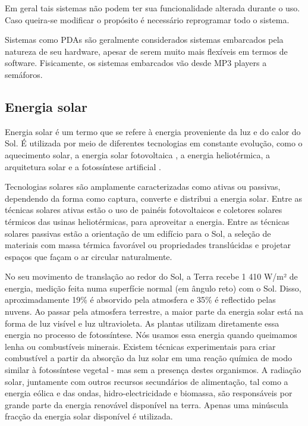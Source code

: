 \documentclass[final,12pt, times, 5p, twocolumn]{elsarticle}
\begin{document}
Em geral tais sistemas não podem ter sua funcionalidade alterada durante o uso. Caso queira-se modificar o propósito é necessário reprogramar todo o sistema.

Sistemas como PDAs são geralmente considerados sistemas embarcados pela natureza de seu hardware, apesar de serem muito mais flexíveis em termos de software. Fisicamente, os sistemas embarcados vão desde MP3 players a semáforos.

\subsection{Energia solar}

Energia solar é um termo que se refere à energia proveniente da luz e do calor do Sol. É utilizada por meio de diferentes tecnologias em constante evolução, como o aquecimento solar, a energia solar fotovoltaica , a energia heliotérmica, a arquitetura solar e a fotossíntese artificial \cite{SolarFuel}.

Tecnologias solares são amplamente caracterizadas como ativas ou passivas, dependendo da forma como captura, converte e distribui a energia solar. Entre as técnicas solares ativas estão o uso de painéis fotovoltaicos e coletores solares térmicos das usinas heliotérmicas, para aproveitar a energia. Entre as técnicas solares passivas estão a orientação de um edifício para o Sol, a seleção de materiais com massa térmica favorável ou propriedades translúcidas e projetar espaços que façam o ar circular naturalmente.

No seu movimento de translação ao redor do Sol, a Terra recebe 1 410 W/m² de energia, medição feita numa superfície normal (em ângulo reto) com o Sol. Disso, aproximadamente 19\% é absorvido pela atmosfera e 35\% é reflectido pelas nuvens. Ao passar pela atmosfera terrestre, a maior parte da energia solar está na forma de luz visível e luz ultravioleta. As plantas utilizam diretamente essa energia no processo de fotossíntese. Nós usamos essa energia quando queimamos lenha ou combustíveis minerais. Existem técnicas experimentais para criar combustível a partir da absorção da luz solar em uma reação química de modo similar à fotossíntese vegetal - mas sem a presença destes organismos. A radiação solar, juntamente com outros recursos secundários de alimentação, tal como a energia eólica e das ondas, hidro-electricidade e biomassa, são responsáveis por grande parte da energia renovável disponível na terra. Apenas uma minúscula fracção da energia solar disponível é utilizada.
\end{document}
